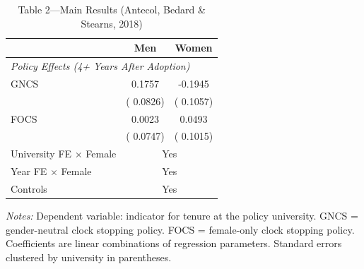 \begin{table}[htbp]
\centering
\caption{Table 2---Main Results (Antecol, Bedard \& Stearns, 2018)}
\label{tab:antecol_table2}
\begin{tabular}{lcc}
\toprule
 & Men & Women \\
\midrule
\multicolumn{3}{l}{\textit{Policy Effects (4+ Years After Adoption)}} \\[3pt]
GNCS &   0.1757 &  -0.1945 \\
 & (  0.0826) & (  0.1057) \\
FOCS &   0.0023 &   0.0493 \\
 & (  0.0747) & (  0.1015) \\[6pt]
\midrule
University FE $\times$ Female & \multicolumn{2}{c}{Yes} \\
Year FE $\times$ Female & \multicolumn{2}{c}{Yes} \\
Controls & \multicolumn{2}{c}{Yes} \\
\bottomrule
\end{tabular}

\vspace{6pt}
\begin{minipage}{0.85\textwidth}
\footnotesize
\textit{Notes:} Dependent variable: indicator for tenure at the policy university. 
GNCS = gender-neutral clock stopping policy. FOCS = female-only clock stopping policy. 
Coefficients are linear combinations of regression parameters. 
Standard errors clustered by university in parentheses.
\end{minipage}
\end{table}
